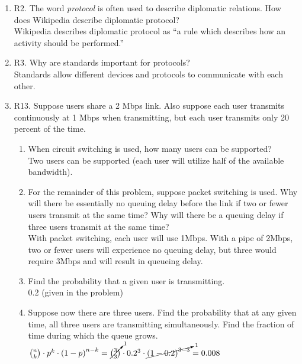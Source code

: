 \documentclass[12pt]{article}
\begin{document}
\begin{enumerate}
\item R2. The word \textit{protocol} is often used to describe diplomatic relations. How does Wikipedia describe diplomatic protocol?\\[1em]
Wikipedia describes diplomatic protocol as ``a rule which describes how an activity should be performed.''

\item R3. Why are standards important for protocols?\\[1em]
Standards allow different devices and protocols to communicate with each other.

\item R13. Suppose users share a 2 Mbps link. Also suppose each user transmits continuously at 1 Mbps when transmitting, but each user transmits only 20 percent of the time.
    \begin{enumerate}
        \item When circuit switching is used, how many users can be supported?\\[1em]
        Two users can be supported (each user will utilize half of the available bandwidth).
        \item For the remainder of this problem, suppose packet switching is used. Why will there be essentially no queuing delay before the link if two or fewer users transmit at the same time? Why will there be a queuing delay if three users transmit at the same time?\\[1em]
        With packet switching, each user will use 1Mbps. With a pipe of 2Mbps, two or fewer users will experience no queuing delay, but three would require 3Mbps and will result in queueing delay.
        \item Find the probability that a given user is transmitting.\\[1em]
        0.2 (given in the problem)
        \item Suppose now there are three users. Find the probability that at any given time, all three users are transmitting simultaneously. Find the fraction of time during which the queue grows.\\[1em]
        \(\binom{n}{k}
        \cdot p^{k}
        \cdot \left(1-p\right)^{n-k}
        =\cancelto{1}{\binom{3}{3}}
        \cdot 0.2^{3}
        \cdot\cancelto{1}{\left(1-0.2\right)^{3-3}}
        =0.008\)
    \end{enumerate}


\end{enumerate}
\end{document}

